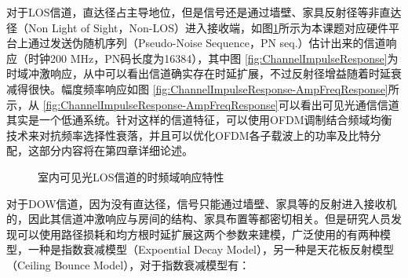对于LOS信道，直达径占主导地位，但是信号还是通过墙壁、家具反射径等非直达径（Non Light of Sight，Non-LOS）进入接收端，如图\ref{fig:LOSChannelResponse}所示为本课题对应硬件平台上通过发送伪随机序列（Pseudo-Noise Sequence，PN seq.）估计出来的信道响应（时钟200 MHz，PN码长度为16384），其中图
\ref{fig:ChannelImpulseResponse}为时域冲激响应，从中可以看出信道确实存在时延扩展，不过反射径增益随着时延衰减得很快。幅度频率响应如图
\ref{fig:ChannelImpulseResponse-AmpFreqResponse}所示，从
\ref{fig:ChannelImpulseResponse-AmpFreqResponse}可以看出可见光通信信道其实是一个低通系统。针对这样的信道特征，可以使用OFDM调制结合频域均衡技术来对抗频率选择性衰落，并且可以优化OFDM各子载波上的功率及比特分配，这部分内容将在第四章详细论述。
\begin{figure}[htbp]
    \centering
    \caption{室内可见光LOS信道的时频域响应特性}
    \label{fig:LOSChannelResponse}
\end{figure}
对于DOW信道，因为没有直达径，信号只能通过墙壁、家具等的反射进入接收机的，因此其信道冲激响应与房间的结构、家具布置等都密切相关。但是研究人员发现可以使用路径损耗和均方根时延扩展这两个参数来建模\cite{carruthers1997modeling}，广泛使用的有两种模型，一种是指数衰减模型（Expoential Decay Model），另一种是天花板反射模型（Ceiling Bounce Model），对于指数衰减模型有：
